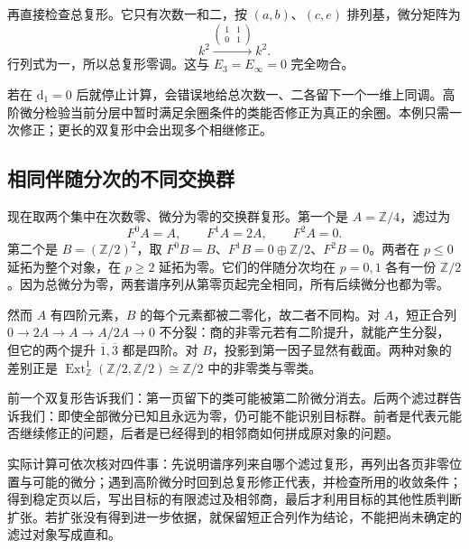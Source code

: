 \ProseParagraphBreak
再直接检查总复形。它只有次数一和二，按 \((a,b)\)、\((c,e)\) 排列基，微分矩阵为
\[
 k^2\xrightarrow{\left(\begin{smallmatrix}1&1\\0&1\end{smallmatrix}\right)}k^2.
\]
行列式为一，所以总复形零调。这与 \(E_3=E_\infty=0\) 完全吻合。

\ProseParagraphBreak
若在 \(\mathrm{d}_1=0\) 后就停止计算，会错误地给总次数一、二各留下一个一维上同调。高阶微分检验当前分层中暂时满足余圈条件的类能否修正为真正的余圈。本例只需一次修正；更长的双复形中会出现多个相继修正。

\subsection{相同伴随分次的不同交换群}
\label{b4:subsec:1405:04}

现在取两个集中在次数零、微分为零的交换群复形。第一个是 \(A=\mathbb Z/4\)，滤过为
\[
 F^0A=A,\qquad F^1A=2A,\qquad F^2A=0.
\]
第二个是 \(B=(\mathbb Z/2)^2\)，取 \(F^0B=B\)、\(F^1B=0\oplus\mathbb Z/2\)、\(F^2B=0\)。两者在 \(p\le0\) 延拓为整个对象，在 \(p\ge2\) 延拓为零。它们的伴随分次均在 \(p=0,1\) 各有一份 \(\mathbb Z/2\)。因为总微分为零，两套谱序列从第零页起完全相同，所有后续微分也都为零。

\ProseParagraphBreak
然而 \(A\) 有四阶元素，\(B\) 的每个元素都被二零化，故二者不同构。对 \(A\)，短正合列 \(0\to2A\to A\to A/2A\to0\) 不分裂：商的非零元若有二阶提升，就能产生分裂，但它的两个提升 \(\overline1,\overline3\) 都是四阶。对 \(B\)，投影到第一因子显然有截面。两种对象的差别正是 \(\operatorname{Ext}_{\mathbb Z}^1(\mathbb Z/2,\mathbb Z/2)\cong\mathbb Z/2\) 中的非零类与零类。

\ProseParagraphBreak
前一个双复形告诉我们：第一页留下的类可能被第二阶微分消去。后两个滤过群告诉我们：即使全部微分已知且永远为零，仍可能不能识别目标群。前者是代表元能否继续修正的问题，后者是已经得到的相邻商如何拼成原对象的问题。

\ProseParagraphBreak
实际计算可依次核对四件事：先说明谱序列来自哪个滤过复形，再列出各页非零位置与可能的微分；遇到高阶微分时回到总复形修正代表，并检查所用的收敛条件；得到稳定页以后，写出目标的有限滤过及相邻商，最后才利用目标的其他性质判断扩张。若扩张没有得到进一步依据，就保留短正合列作为结论，不能把尚未确定的滤过对象写成直和。

